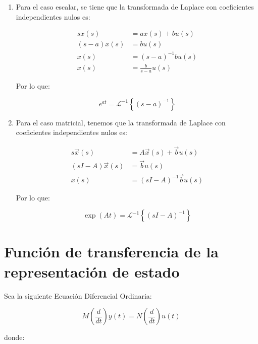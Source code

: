 \begin{enumerate}

\item
Para el caso escalar, se tiene que la transformada de Laplace con coeficientes independientes nulos es:

\begin{align}
s x(s)       & = a x(s) + b u(s) \nonumber\\
(s - a) x(s) & = b u(s) \nonumber\\
x(s)         & = (s - a)^{-1} b u(s) \nonumber\\
x(s)         & = \frac{b}{s - a} u(s) \nonumber
\end{align}

Por lo que:

\begin{equation}
e^{at} = \mathcal{L}^{-1} \left\{ (s - a)^{-1} \right\}
\end{equation}

\item
Para el caso matricial, tenemos que la transformada de Laplace con coeficientes independientes nulos es:

\begin{align}
s \vec{x}(s)         & = A \vec{x}(s) + \vec{b} u(s) \nonumber \\
(s I - A) \vec{x}(s) & = \vec{b} u(s) \nonumber \\
x(s)                 & = (s I - A)^{-1} \vec{b} u(s) \nonumber
\end{align}

Por lo que:

\begin{equation}
\exp{(At)} = \mathcal{L}^{-1} \left\{ (s I - A)^{-1} \right\}
\end{equation}

\end{enumerate}

\section{Función de transferencia de la representación de estado}

Sea la siguiente Ecuación Diferencial Ordinaria:

\begin{equation}
M \left( \frac{d}{dt} \right) y(t) = N \left( \frac{d}{dt} \right) u(t) \nonumber
\end{equation}

donde:

